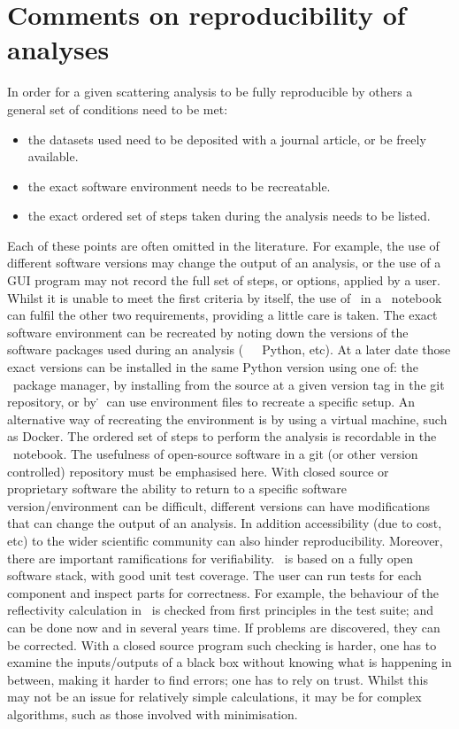 \documentclass[12pt]{article}
\begin{document}
\section*{Comments on reproducibility of analyses}
In order for a given scattering analysis to be fully reproducible by others a general set of conditions need to be met:
\begin{itemize}
  \item the datasets used need to be deposited with a journal article, or be freely available.
  \item the exact software environment needs to be recreatable.
  \item the exact ordered set of steps taken during the analysis needs to be listed.
\end{itemize} 
Each of these points are often omitted in the literature. For example, the use of different software versions may change the output of an analysis, or the use of a GUI program may not record the full set of steps, or options, applied by a user.
Whilst it is unable to meet the first criteria by itself, the use of \ in a \Jupyter\ notebook can fulfil the other two requirements, providing a little care is taken. The exact software environment can be recreated by noting down the versions of the software packages used during an analysis (\, \SciPy\, \NumPy\, Python, etc). At a later date those exact versions can be installed in the same Python version using one of: the \conda\ package manager, by installing from the source at a given version tag in the git repository, or by \pip\. \conda\ can use environment files to recreate a specific setup. An alternative way of recreating the environment is by using a virtual machine, such as Docker. The ordered set of steps to perform the analysis is recordable in the \Jupyter\ notebook.
The usefulness of open-source software in a git (or other version controlled) repository must be emphasised here. With closed source or proprietary software the ability to return to a specific software version/environment can be difficult, different versions can have modifications that can change the output of an analysis. In addition accessibility (due to cost, etc) to the wider scientific community can also hinder reproducibility.
Moreover, there are important ramifications for verifiability. \ is based on a fully open software stack, with good unit test coverage. The user can run tests for each component and inspect parts for correctness. For example, the behaviour of the reflectivity calculation in \ is checked from first principles in the test suite; and can be done now and in several years time. If problems are discovered, they can be corrected. With a closed source program such checking is harder, one has to examine the inputs/outputs of a black box without knowing what is happening in between, making it harder to find errors; one has to rely on trust. Whilst this may not be an issue for relatively simple calculations, it may be for complex algorithms, such as those involved with minimisation.
\end{document}
